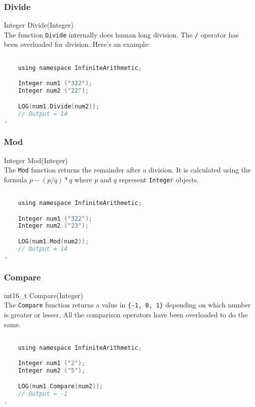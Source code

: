 \subsubsection{Divide}
{\ttfamily \large Integer Divide(Integer)} \\[2mm]
The function \verb|Divide| internally does human long division. The \verb|/| operator has been overloaded for division. Here's an example:
\vspace*{1em}
\begin{lstlisting}[language = C]	

	using namespace InfiniteArithmetic;

	Integer num1 ("322");
	Integer num2 ("22");

	LOG(num1.Divide(num2));
	// Output = 14
.
\end{lstlisting}
\vspace*{1em}


\subsubsection{Mod}
{\ttfamily \large Integer Mod(Integer)} \\[2mm]
The \verb|Mod| function returns the remainder after a division. It is calculated using the formula $p - (p/q)*q$ where $p$ and $q$ represent \verb|Integer| objects.
\vspace*{1em}
\begin{lstlisting}[language = C]

	using namespace InfiniteArithmetic;

	Integer num1 ("322");
	Integer num2 ("23");

	LOG(num1.Mod(num2));
	// Output = 14
.
\end{lstlisting}
\vspace*{1em}


\subsubsection{Compare}
{\ttfamily \large int16\_t Compare(Integer)} \\[2mm]
The \verb|Compare| function returns a value in \verb|{-1, 0, 1}| depending on which number is greater or lesser. All the comparison operators have been overloaded to do the same.
\vspace*{1em}
\begin{lstlisting}[language = C]

	using namespace InfiniteArithmetic;

	Integer num1 ("2");
	Integer num2 ("5");

	LOG(num1.Compare(num2));
	// Output = -1
.
\end{lstlisting}
\vspace*{1em}


